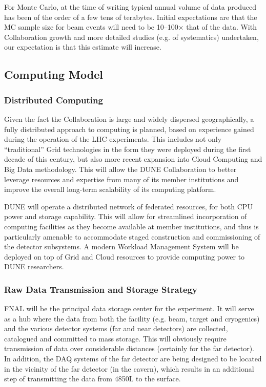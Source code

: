 For Monte Carlo, at the time of writing typical annual volume of data
produced has been of the order of a few tens of terabytes.  Initial
expectations are that the MC sample size for beam events will need to
be 10--100$\times$ that of the data.  With Collaboration growth
and more detailed studies (e.g. of systematics) undertaken, our
expectation is that this estimate will increase.

\subsection{Computing Model}
\label{sec:detectors-sc-infrastructure-computing-model}

\subsubsection{Distributed Computing}

Given the fact the Collaboration is large and widely dispersed
geographically, a fully distributed approach to computing is planned,
based on experience gained during the operation of the LHC
experiments. This includes not only ``traditional'' Grid technologies
in the form they were deployed during the first decade of this
century, but also more recent expansion into Cloud Computing and Big
Data methodology. This will allow the DUNE Collaboration to better
leverage resources and expertise from many of its member institutions
and improve the overall long-term scalability of its computing
platform.

DUNE will operate a distributed network of federated resources, for
both CPU power and storage capability. This will allow for streamlined
incorporation of computing facilities as they become available at
member institutions, and thus is particularly amenable to accommodate
staged construction and commissioning of the detector subsystems. A
modern Workload Management System will be deployed on top of Grid and
Cloud resources to provide computing power to DUNE researchers.

\subsubsection{Raw Data Transmission and Storage Strategy}
FNAL will be the principal data storage center for the experiment. It
will serve as a hub where the data from both the facility (e.g. beam,
target and cryogenics) and the various detector systems (far and near
detectors) are collected, catalogued and committed to mass
storage. This will obviously require transmission of data over
considerable distances (certainly for the far detector). In addition,
the DAQ systems of the far detector are being designed to be located
in the vicinity of the far detector (in the cavern), which results in
an additional step of transmitting the data from 4850L to the surface.

